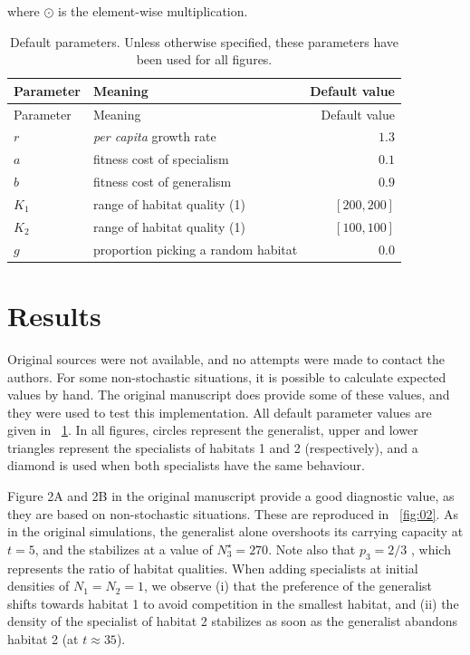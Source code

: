 \documentclass[10pt,a4paper,onecolumn]{article}
\begin{document}
where \(\odot\) is the element-wise multiplication.

\hypertarget{tbl:prm}{}
\begin{longtable}[]{@{}llr@{}}
\caption{\label{tbl:prm}Default parameters. Unless otherwise specified,
these parameters have been used for all figures. }\tabularnewline
\toprule
Parameter & Meaning & Default value\tabularnewline
\midrule
\endfirsthead
\toprule
Parameter & Meaning & Default value\tabularnewline
\midrule
\endhead
\(r\) & \emph{per capita} growth rate & \(1.3\)\tabularnewline
\(a\) & fitness cost of specialism & \(0.1\)\tabularnewline
\(b\) & fitness cost of generalism & \(0.9\)\tabularnewline
\(K_1\) & range of habitat quality (1) & \([200,200]\)\tabularnewline
\(K_2\) & range of habitat quality (1) & \([100,100]\)\tabularnewline
\(g\) & proportion picking a random habitat & \(0.0\)\tabularnewline
\bottomrule
\end{longtable}

\section{Results}\label{results}

Original sources were not available, and no attempts were made to
contact the authors. For some non-stochastic situations, it is possible
to calculate expected values by hand. The original manuscript does
provide some of these values, and they were used to test this
implementation. All default parameter values are given in
~\ref{tbl:prm}. In all figures, circles represent the generalist, upper
and lower triangles represent the specialists of habitats 1 and 2
(respectively), and a diamond is used when both specialists have the
same behaviour.

Figure 2A and 2B in the original manuscript provide a good diagnostic
value, as they are based on non-stochastic situations. These are
reproduced in ~\ref{fig:02}. As in the original simulations, the
generalist alone overshoots its carrying capacity at \(t=5\), and the
stabilizes at a value of \(N_3^\star = 270\). Note also that
\(p_3 = 2/3\) , which represents the ratio of habitat qualities. When
adding specialists at initial densities of \(N_1 = N_2 = 1\), we observe
(i) that the preference of the generalist shifts towards habitat 1 to
avoid competition in the smallest habitat, and (ii) the density of the
specialist of habitat 2 stabilizes as soon as the generalist abandons
habitat 2 (at \(t \approx 35\)).
\end{document}
